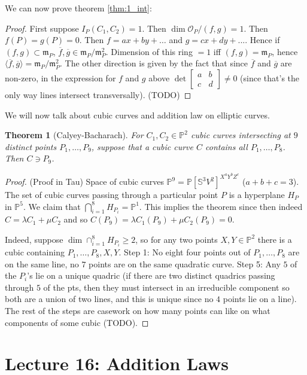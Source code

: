 \documentclass[12pt]{article}
\renewcommand{\P}{\mathbb{P}}
\renewcommand{\S}{\mathbb{S}}
\newcommand{\m}{\mathfrak{m}}
\renewcommand{\O}{\mathcal{O}}
\newtheorem{theorem}{Theorem}[section]
\begin{document}
    We can now prove theorem \ref{thm:1_int}:
    \begin{proof}
        First suppose $I_P(C_1, C_2) = 1$. Then $\dim \O_P/(f, g) = 1$. Then $f(P) = g(P) = 0$. Then $f = ax+by + \dots $ and $g = cx + dy + ...$. Hence if $(f, g) \subset \m_P$, $\overline{f}, \overline{g} \in \m_P/\m_P^2$. Dimension of this ring $=1$ iff $(f, g) = \m_P$, hence $\langle \overline{f}, \overline{g} \rangle = \m_P/\m_P^2$. The other direction is given by the fact that since $\overline{f}$ and $\overline{g}$ are non-zero, in the expression for $f$ and $g$ above $\det \begin{bmatrix}
            a & b \\
            c & d
        \end{bmatrix} \neq 0$ (since that's the only way lines intersect transversally). (TODO)
    \end{proof}
    We will now talk about cubic curves and addition law on elliptic curves.
    \begin{theorem}
        [Calyey-Bacharach] For $C_1, C_2 \in \P^2$ cubic curves intersecting at $9$ distinct points $P_1, \dots, P_9$, suppose that a cubic curve $C$ contains all $P_1, \dots, P_8$. Then $C \ni P_9$.
    \end{theorem}
    \begin{proof}
        (Proof in Tau) Space of cubic curves $\P^9 = \P[\S^3V^2]^{X^aY^bZ^c}$ ($a + b + c = 3$). The set of cubic curves passing through a particular point $P$ is a hyperplane $H_P$ in $\P^5$. We claim that $\bigcap_{i=1}^8 H_{P_i} = \P^1$. This implies the theorem since then indeed $C = \lambda C_1 + \mu C_2$ and so $C(P_9) = \lambda C_1(P_9) + \mu C_2(P_9) = 0$. \par
        Indeed, suppose $\dim \cap_{i=1}^8 H_{P_i} \geq 2$, so for any two points $X, Y \in \P^2$ there is a cubic containing $P_1, \dots, P_8, X, Y$. Step 1: No eight four points out of $P_1, \dots, P_8$ are on the same line, no $7$ points are on the same quadratic curve. Step 5: Any $5$ of the $P_i$'s lie on a unique quadric (if there are two distinct quadrics passing through $5$ of the pts, then they must intersect in an irreducible component so both are a union of two lines, and this is unique since no $4$ points lie on a line). The rest of the steps are casework on how many points can like on what components of some cubic (TODO).
    \end{proof}

\section{Lecture 16: Addition Laws}
\end{document}
